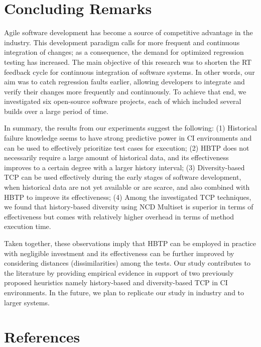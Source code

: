 \documentclass[1p]{elsarticle}
\begin{document}
\section{Concluding Remarks}

Agile software development has become a source of competitive advantage in the industry. This development paradigm calls for more frequent and continuous integration of changes; as a consequence, the demand for optimized regression testing has increased. The main objective of this research was to shorten the RT feedback cycle for continuous integration of software systems. In other words, our aim was to catch regression faults earlier, allowing developers to integrate and verify their changes more frequently and continuously. To achieve that end, we investigated six open-source software projects, each of which included several builds over a large period of time. 

In summary, the results from our experiments suggest the following: (1) Historical failure knowledge seems to have strong predictive power in CI environments and can be used to effectively prioritize test cases for execution; (2) HBTP does not necessarily require a large amount of historical data, and its effectiveness improves to a certain degree with a larger history interval; (3) Diversity-based TCP can be used effectively during the early stages of software development, when historical data are not yet available or are scarce, and also combined with HBTP to improve its effectiveness; (4) Among the investigated TCP techniques, we found that history-based diversity using NCD Multiset is superior in terms of effectiveness but comes with relatively higher overhead in terms of method execution time.

Taken together, these observations imply that HBTP can be employed in practice with negligible investment and its effectiveness can be further improved by considering distances (dissimilarities) among the tests. Our study contributes to the literature by providing empirical evidence in support of two previously proposed heuristics namely history-based and diversity-based TCP in CI environments. In the future, we plan to replicate our study in industry and to larger systems.

\section*{References}

\end{document}
